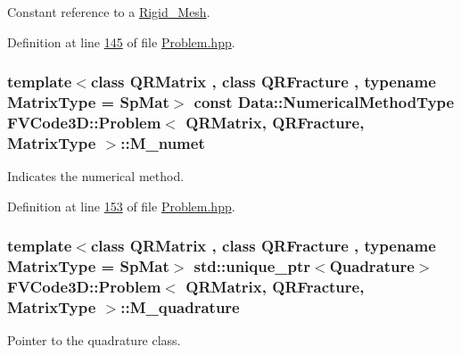 Constant reference to a \hyperlink{classFVCode3D_1_1Rigid__Mesh}{Rigid\+\_\+\+Mesh}. 



Definition at line \hyperlink{Problem_8hpp_source_l00145}{145} of file \hyperlink{Problem_8hpp_source}{Problem.\+hpp}.

\subsubsection[{\texorpdfstring{M\+\_\+numet}{M_numet}}]{\setlength{\rightskip}{0pt plus 5cm}template$<$class Q\+R\+Matrix , class Q\+R\+Fracture , typename Matrix\+Type  = Sp\+Mat$>$ const {\bf Data\+::\+Numerical\+Method\+Type} {\bf F\+V\+Code3\+D\+::\+Problem}$<$ Q\+R\+Matrix, Q\+R\+Fracture, Matrix\+Type $>$\+::M\+\_\+numet\hspace{0.3cm}{\ttfamily [protected]}}\hypertarget{classFVCode3D_1_1Problem_a2ed1b05f24ab6100c6a389e22df7e098}{}\label{classFVCode3D_1_1Problem_a2ed1b05f24ab6100c6a389e22df7e098}


Indicates the numerical method. 



Definition at line \hyperlink{Problem_8hpp_source_l00153}{153} of file \hyperlink{Problem_8hpp_source}{Problem.\+hpp}.

\subsubsection[{\texorpdfstring{M\+\_\+quadrature}{M_quadrature}}]{\setlength{\rightskip}{0pt plus 5cm}template$<$class Q\+R\+Matrix , class Q\+R\+Fracture , typename Matrix\+Type  = Sp\+Mat$>$ std\+::unique\+\_\+ptr$<${\bf Quadrature}$>$ {\bf F\+V\+Code3\+D\+::\+Problem}$<$ Q\+R\+Matrix, Q\+R\+Fracture, Matrix\+Type $>$\+::M\+\_\+quadrature\hspace{0.3cm}{\ttfamily [protected]}}\hypertarget{classFVCode3D_1_1Problem_ace5ff91974a55df1e4cbc6ef879f790f}{}\label{classFVCode3D_1_1Problem_ace5ff91974a55df1e4cbc6ef879f790f}


Pointer to the quadrature class. 



